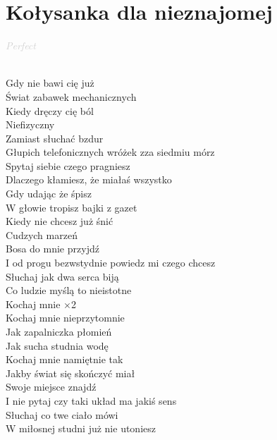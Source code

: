 \documentclass[a5paper, 10pt]{book}
\begin{document}
\section{Kołysanka dla nieznajomej}\textcolor{lightgray}{\textit{Perfect}}\\~\\
\begin{minipage}[t]{0.7\textwidth}
  Gdy nie bawi cię już\\
  Świat zabawek mechanicznych\\
  Kiedy dręczy cię ból\\
  Niefizyczny\\
  Zamiast słuchać bzdur\\
  Głupich telefonicznych wróżek zza siedmiu mórz\\
  Spytaj siebie czego pragniesz\\
  Dlaczego kłamiesz, że miałaś wszystko\\

  Gdy udając że śpisz\\
  W głowie tropisz bajki z gazet\\
  Kiedy nie chcesz już śnić\\
  Cudzych marzeń\\
  Bosa do mnie przyjdź\\
  I od progu bezwstydnie powiedz mi czego chcesz\\
  Słuchaj jak dwa serca biją\\
  Co ludzie myślą to nieistotne\\

  \hspace*{5mm}Kochaj mnie   \hspace*{8mm} $\times$2\\
  \hspace*{5mm}Kochaj mnie nieprzytomnie\\
  \hspace*{5mm}Jak zapalniczka płomień\\
  \hspace*{5mm}Jak sucha studnia wodę\\
  \hspace*{5mm}Kochaj mnie namiętnie tak\\
  \hspace*{5mm}Jakby świat się skończyć miał\\

  Swoje miejsce znajdź\\
  I nie pytaj czy taki układ ma jakiś sens\\
  Słuchaj co twe ciało mówi\\
  W miłosnej studni już nie utoniesz\\


\end{minipage}
\end{document}
